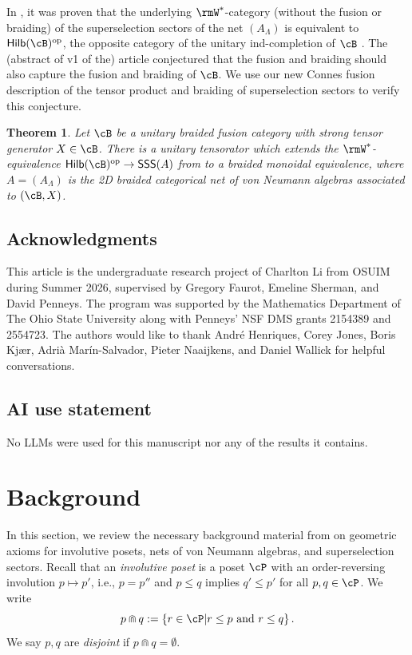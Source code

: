 \documentclass[11pt,reqno]{amsart}
\newcommand{\set}[2]{\left\{#1 \middle| #2\right\}}
\newcommand{\Hilb}{\mathsf{Hilb}}
\numberwithin{equation}{section}
\theoremstyle{plain}
\newtheorem{thmalpha}{Theorem}
\theoremstyle{definition}
\begin{document}
In \cite[Thm.~4.8]{2506.19969}, it was proven that the 
underlying $\rmW^*$-category (without the fusion or braiding) of the superselection sectors of the net $(A_\Lambda)$ is equivalent to $\Hilb(\cB)^{\rm op}$, the opposite category of the unitary ind-completion of $\cB$ \cite{MR3509018,MR3687214}.
The (abstract of v1 of the) article \cite{2506.19969} conjectured that the fusion and braiding should also capture the fusion and braiding of $\cB$.
We use our new Connes fusion description of the tensor product and braiding of superselection sectors to verify this conjecture. 

\begin{thmalpha} \label{thm:B}
    Let $\cB$ be a unitary braided fusion category with strong tensor generator $X \in \cB$.
    There is a unitary tensorator which extends the
    $\rmW^*$-equivalence $\Hilb(\cB)^{\rm op}\to \mathsf{SSS}(A)$ from \cite{2506.19969} to a braided monoidal equivalence, where $A=(A_\Lambda)$ is the 2D braided categorical net of von Neumann algebras associated to $(\cB,X)$.
\end{thmalpha}

\subsection*{Acknowledgments}

This article is the undergraduate research project of Charlton Li from OSUIM during Summer 2026, supervised by Gregory Faurot, Emeline Sherman, and David Penneys.
The program was supported by the Mathematics Department of The Ohio State University along with Penneys' NSF DMS grants 2154389 and 2554723.
The authors would like to thank 
Andr\'e Henriques,
Corey Jones,
Boris Kj{\ae}r,
Adri\`a Mar\'in-Salvador,
Pieter Naaijkens,
and
Daniel Wallick
for helpful conversations. 

\subsection*{AI use statement}
No LLMs were used for this manuscript nor any of the results it contains.

\section{Background}\label{sec:background}

In this section, we review the necessary background material from \cite{MR4927814} on geometric axioms for involutive posets, nets of von Neumann algebras, and superselection sectors.
Recall that an \emph{involutive poset} is a poset $\cP$ with an  order-reversing involution $p\mapsto p'$, i.e., $p=p''$ and $p\leq q$ implies $q'\leq p'$ for all $p,q\in \cP$.
We write
\[
p\Cap q:= \set{r\in \cP}{r\leq p\text{ and }r\leq q}.
\]
We say $p,q$ are \emph{disjoint} if $p\Cap q = \emptyset$.
\end{document}
